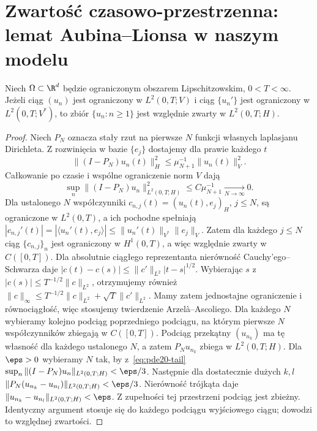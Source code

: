 \section{Zwartość czasowo-przestrzenna: lemat Aubina--Lionsa w naszym modelu}
\begin{twierdzenie}\label{thm:pde20-compact}
Niech $\Omega\subset\R^d$ będzie ograniczonym obszarem
Lipschitzowskim, $0<T<\infty$. Jeżeli ciąg $(u_n)$ jest ograniczony
w $L^2(0,T;V)$ i ciąg $\{u_n'\}$ jest ograniczony
w $L^2(0,T;V^*)$, to zbiór $\{u_n:n\ge1\}$ jest względnie
zwarty w $L^2(0,T;H)$.
\end{twierdzenie}
\begin{proof}
Niech $P_N$ oznacza stały rzut na pierwsze $N$ funkcji
własnych laplasjanu Dirichleta. Z rozwinięcia w bazie
$\{e_j\}$ dostajemy dla prawie każdego $t$
\[
 \|(I-P_N)u_n(t)\|_H^2
 \le\mu_{N+1}^{-1}\|u_n(t)\|_V^2.
\]
Całkowanie po czasie i wspólne ograniczenie norm $V$ dają
\begin{equation}\label{eq:pde20-tail}
 \sup_n\|(I-P_N)u_n\|_{L^2(0,T;H)}^2
 \le C\mu_{N+1}^{-1}\xrightarrow[N\to\infty]{}0.
\end{equation}
Dla ustalonego $N$ współczynniki
$c_{n,j}(t)=(u_n(t),e_j)_H$, $j\le N$, są ograniczone
w $L^2(0,T)$, a ich pochodne spełniają
$|c_{n,j}'(t)|=|\langle u_n'(t),e_j\rangle|
\le\|u_n'(t)\|_{V^*}\|e_j\|_V$.
Zatem dla każdego $j\le N$ ciąg $\{c_{n,j}\}_n$ jest
ograniczony w $H^1(0,T)$, a więc względnie zwarty
w $C([0,T])$. Dla absolutnie ciągłego reprezentanta
nierówność Cauchy'ego--Schwarza daje
$|c(t)-c(s)|\le\|c'\|_{L^2}|t-s|^{1/2}$.
Wybierając $s$ z $|c(s)|\le T^{-1/2}\|c\|_{L^2}$,
otrzymujemy również
$\|c\|_\infty\le T^{-1/2}\|c\|_{L^2}
+\sqrt T\|c'\|_{L^2}$.
Mamy zatem jednostajne ograniczenie i równociągłość,
więc stosujemy twierdzenie Arzelà--Ascoliego.
Dla każdego $N$ wybieramy kolejno podciąg poprzedniego
podciągu, na którym pierwsze $N$ współczynników
zbiegają w $C([0,T])$. Podciąg przekątny $(u_{n_k})$
ma tę własność dla każdego ustalonego $N$,
a zatem $P_Nu_{n_k}$ zbiega w $L^2(0,T;H)$.
Dla $\eps>0$ wybieramy $N$ tak, by z~\eqref{eq:pde20-tail}
$\sup_n\|(I-P_N)u_n\|_{L^2(0,T;H)}<\eps/3$.
Następnie dla dostatecznie dużych $k,l$
$\|P_N(u_{n_k}-u_{n_l})\|_{L^2(0,T;H)}<\eps/3$.
Nierówność trójkąta daje
$\|u_{n_k}-u_{n_l}\|_{L^2(0,T;H)}<\eps$.
Z zupełności tej przestrzeni podciąg jest zbieżny.
Identyczny argument stosuje się do każdego podciągu
wyjściowego ciągu; dowodzi to względnej zwartości.
\end{proof}


